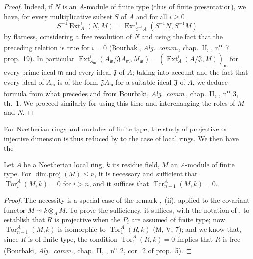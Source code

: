 \begin{proof}
Indeed, if $N$ is an $A$-module of finite type (thus of finite presentation), we have, for every multiplicative subset $S$ of $A$ and for all $i\geq 0$
\[
  S^{-1}\operatorname{Ext}^i_A(N,M)=\operatorname{Ext}^i_{S^{-1}\!A}(S^{-1}N,S^{-1}M)
\]
by flatness, considering a free resolution of $N$ and using the fact that the preceding relation is true for $i=0$ (Bourbaki, \emph{Alg.~comm.}, chap.~II, , n\textsuperscript{o}~7, prop.~19).
In particular $\operatorname{Ext}^i_{A_\mathfrak{m}}(A_\mathfrak{m}/\mathfrak{J}A_\mathfrak{m},M_\mathfrak{m})=(\operatorname{Ext}^i_A(A/\mathfrak{J},M))_\mathfrak{m}$ for every prime ideal $\mathfrak{m}$ and every ideal $\mathfrak{J}$ of $A$;
taking into account  and the fact that every ideal of $A_\mathfrak{m}$ is of the form $\mathfrak{J}A_\mathfrak{m}$ for a suitable ideal $\mathfrak{J}$ of $A$, we deduce formula  from what precedes and from Bourbaki, \emph{Alg.~comm.}, chap.~II, , n\textsuperscript{o}~3, th.~1.
We proceed similarly for  using this time  and interchanging the roles of $M$ and $N$.
\end{proof}

For Noetherian rings and modules of finite type, the study of projective or injective dimension is thus reduced by  to the case of local rings.
We then have the

\begin{lemma}[17.2.6]
\label{0.17.2.6}
Let $A$ be a Noetherian local ring, $k$ its residue field, $M$ an $A$-module of finite type.
For $\operatorname{dim.proj}(M)\leq n$, it is necessary and sufficient that $\operatorname{Tor}^A_i(M,k)=0$ for $i>n$, and it suffices that $\operatorname{Tor}^A_{n+1}(M,k)=0$.
\end{lemma}

\begin{proof}
The necessity is a special case of the remark ,~(ii), applied to the covariant functor $M\leadsto k\otimes_A M$.
To prove the sufficiency, it suffices, with the notation of , to establish that $R$ is projective when the $P_i$ are assumed of finite type;
now $\operatorname{Tor}^A_{n+1}(M,k)$ is isomorphic to $\operatorname{Tor}^A_1(R,k)$ (M, V, 7);
and we know that, since $R$ is of finite type, the condition $\operatorname{Tor}^A_1(R,k)=0$ implies that $R$ is free (Bourbaki, \emph{Alg.~comm.}, chap.~II, , n\textsuperscript{o}~2, cor.~2 of prop.~5).
\end{proof}

